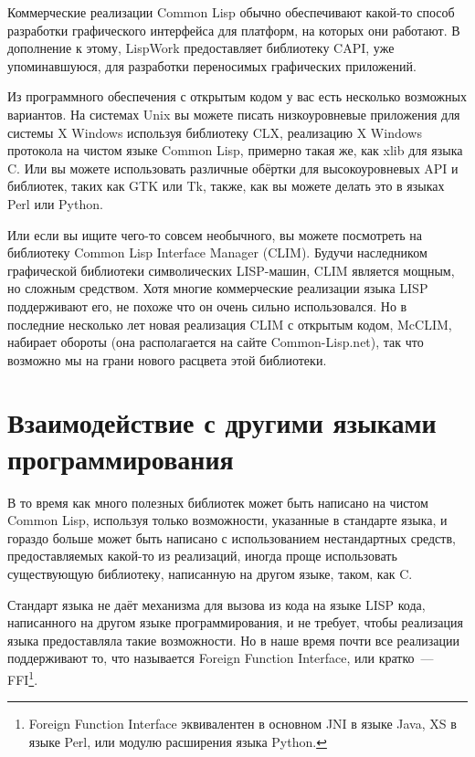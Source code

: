 Коммерческие реализации Common Lisp обычно обеспечивают какой-то способ разработки
графического интерфейса для платформ, на которых они работают. В дополнение к этому,
LispWork предоставляет библиотеку CAPI, уже упоминавшуюся, для разработки переносимых
графических приложений.

Из программного обеспечения с открытым кодом у вас есть несколько возможных вариантов. На
системах Unix вы можете писать низкоуровневые приложения для системы X Windows используя
библиотеку CLX, реализацию X Windows протокола на чистом языке Common Lisp, примерно такая
же, как xlib для языка C. Или вы можете использовать различные обёртки для высокоуровневых
API и библиотек, таких как GTK или Tk, также, как вы можете делать это в языках Perl или
Python.

Или если вы ищите чего-то совсем необычного, вы можете посмотреть на библиотеку Common
Lisp Interface Manager (CLIM). Будучи наследником графической библиотеки символических
LISP-машин, CLIM является мощным, но сложным средством. Хотя многие коммерческие
реализации языка LISP поддерживают его, не похоже что он очень сильно использовался. Но в
последние несколько лет новая реализация CLIM с открытым кодом, McCLIM, набирает обороты
(она располагается на сайте Common-Lisp.net), так что возможно мы на грани нового расцвета
этой библиотеки.

\section{Взаимодействие с другими языками программирования}

В то время как много полезных библиотек может быть написано на чистом Common Lisp,
используя только возможности, указанные в стандарте языка, и гораздо больше может быть
написано с использованием нестандартных средств, предоставляемых какой-то из реализаций,
иногда проще использовать существующую библиотеку, написанную на другом языке, таком, как
C.

Стандарт языка не даёт механизма для вызова из кода на языке LISP кода, написанного на
другом языке программирования, и не требует, чтобы реализация языка предоставляла такие
возможности. Но в наше время почти все реализации поддерживают то, что называется Foreign
Function Interface, или кратко~--- FFI\footnote{Foreign Function Interface эквивалентен в
  основном JNI в языке Java, XS в языке Perl, или модулю расширения языка Python.}.

